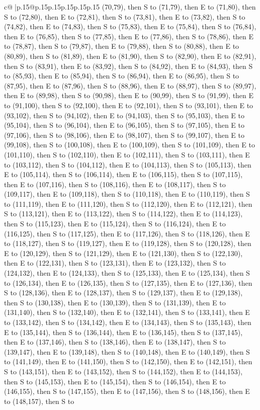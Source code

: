 \documentclass{article}
\begin{document}
{\begin{supertabular}{c@{$\;$}|p{.15\linewidth}@{}p{.15\linewidth}p{.15\linewidth}p{.15\linewidth}p{.15\linewidth}p{.15\linewidth}}
{{{(70,79), then S to (71,79), then E to (71,80), then S to (72,80), then E to (72,81), then S to (73,81), then E to (73,82), then S to (74,82), then E to (74,83), then S to (75,83), then E to (75,84), then S to (76,84), then E to (76,85), then S to (77,85), then E to (77,86), then S to (78,86), then E to (78,87), then S to (79,87), then E to (79,88), then S to (80,88), then E to (80,89), then S to (81,89), then E to (81,90), then S to (82,90), then E to (82,91), then S to (83,91), then E to (83,92), then S to (84,92), then E to (84,93), then S to (85,93), then E to (85,94), then S to (86,94), then E to (86,95), then S to (87,95), then E to (87,96), then S to (88,96), then E to (88,97), then S to (89,97), then E to (89,98), then S to (90,98), then E to (90,99), then S to (91,99), then E to (91,100), then S to (92,100), then E to (92,101), then S to (93,101), then E to (93,102), then S to (94,102), then E to (94,103), then S to (95,103), then E to (95,104), then S to (96,104), then E to (96,105), then S to (97,105), then E to (97,106), then S to (98,106), then E to (98,107), then S to (99,107), then E to (99,108), then S to (100,108), then E to (100,109), then S to (101,109), then E to (101,110), then S to (102,110), then E to (102,111), then S to (103,111), then E to (103,112), then S to (104,112), then E to (104,113), then S to (105,113), then E to (105,114), then S to (106,114), then E to (106,115), then S to (107,115), then E to (107,116), then S to (108,116), then E to (108,117), then S to (109,117), then E to (109,118), then S to (110,118), then E to (110,119), then S to (111,119), then E to (111,120), then S to (112,120), then E to (112,121), then S to (113,121), then E to (113,122), then S to (114,122), then E to (114,123), then S to (115,123), then E to (115,124), then S to (116,124), then E to (116,125), then S to (117,125), then E to (117,126), then S to (118,126), then E to (118,127), then S to (119,127), then E to (119,128), then S to (120,128), then E to (120,129), then S to (121,129), then E to (121,130), then S to (122,130), then E to (122,131), then S to (123,131), then E to (123,132), then S to (124,132), then E to (124,133), then S to (125,133), then E to (125,134), then S to (126,134), then E to (126,135), then S to (127,135), then E to (127,136), then S to (128,136), then E to (128,137), then S to (129,137), then E to (129,138), then S to (130,138), then E to (130,139), then S to (131,139), then E to (131,140), then S to (132,140), then E to (132,141), then S to (133,141), then E to (133,142), then S to (134,142), then E to (134,143), then S to (135,143), then E to (135,144), then S to (136,144), then E to (136,145), then S to (137,145), then E to (137,146), then S to (138,146), then E to (138,147), then S to (139,147), then E to (139,148), then S to (140,148), then E to (140,149), then S to (141,149), then E to (141,150), then S to (142,150), then E to (142,151), then S to (143,151), then E to (143,152), then S to (144,152), then E to (144,153), then S to (145,153), then E to (145,154), then S to (146,154), then E to (146,155), then S to (147,155), then E to (147,156), then S to (148,156), then E to (148,157), then S to }}}
\end{supertabular}}
\end{document}
